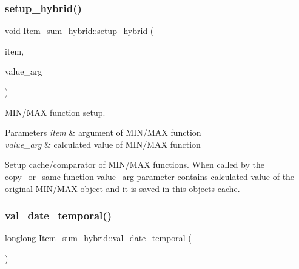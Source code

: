 \mbox{\label{classItem__sum__hybrid_ac38db5969a931eb6af553cc6d8dc6332}} 
\subsubsection{\texorpdfstring{setup\+\_\+hybrid()}{setup\_hybrid()}}
{\footnotesize\ttfamily void Item\+\_\+sum\+\_\+hybrid\+::setup\+\_\+hybrid (\begin{DoxyParamCaption}\item[{\mbox{\hyperlink{classItem}{Item}} $\ast$}]{item,  }\item[{\mbox{\hyperlink{classItem}{Item}} $\ast$}]{value\+\_\+arg }\end{DoxyParamCaption})}

M\+I\+N/\+M\+AX function setup.


\begin{DoxyParams}{Parameters}
{\em item} & argument of M\+I\+N/\+M\+AX function \\
\hline
{\em value\+\_\+arg} & calculated value of M\+I\+N/\+M\+AX function\\
\hline
\end{DoxyParams}
Setup cache/comparator of M\+I\+N/\+M\+AX functions. When called by the copy\+\_\+or\+\_\+same function value\+\_\+arg parameter contains calculated value of the original M\+I\+N/\+M\+AX object and it is saved in this object\textquotesingle{}s cache. \mbox{\label{classItem__sum__hybrid_a33ba0c96d045283cd6ddcf3fcf4ec992}} 
\subsubsection{\texorpdfstring{val\+\_\+date\+\_\+temporal()}{val\_date\_temporal()}}
{\footnotesize\ttfamily longlong Item\+\_\+sum\+\_\+hybrid\+::val\+\_\+date\+\_\+temporal (\begin{DoxyParamCaption}{ }\end{DoxyParamCaption})\hspace{0.3cm}{\ttfamily [virtual]}}

